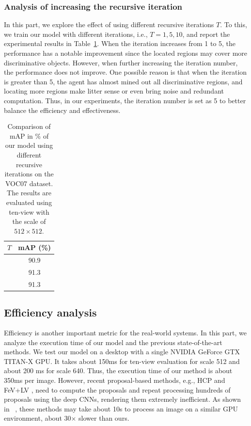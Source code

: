 \documentclass[letterpaper]{article} %
\begin{document}
\subsubsection{Analysis of increasing the recursive iteration}
In this part, we explore the effect of using different recursive iterations $T$. To this, we train our model with different iterations, i.e., $T=1,5,10$, and report the experimental results in Table~\ref{table:recursive_step}. When the iteration increases from 1 to 5, the performance has a notable improvement since the located regions may cover more discriminative objects. However, when further increasing the iteration number, the performance does not improve. One possible reason is that when the iteration is greater than 5, the agent has almost mined out all discriminative regions, and locating more regions make litter sense or even bring noise and redundant computation. Thus, in our experiments, the iteration number is set as 5 to better balance the efficiency and effectiveness.

\begin{table}[htp]
\centering
\begin{tabular}{c|c}
\hline
\centering $T$  & mAP (\%) \\
\hline
\hline
\centering 1 & 90.9  \\
\centering 5  & 91.3  \\
\centering 10 & 91.3 \\
\hline
\end{tabular}
\caption{Comparison of mAP in \% of our model using different recursive iterations on the VOC07 dataset. The results are evaluated using ten-view with the scale of $512\times 512$.}
\label{table:recursive_step}
\end{table}



\subsection{Efficiency analysis}
Efficiency is another important metric for the real-world systems. In this part, we analyze the execution time of our model and the previous state-of-the-art methods. We test our model on a desktop with a single NVIDIA GeForce GTX TITAN-X GPU. It takes about 150ms for ten-view evaluation for scale 512 and about 200 ms for scale 640. Thus, the execution time of our method is about 350ms per image. However, recent proposal-based methods, e.g., HCP \cite{wei2016hcp} and FeV+LV \cite{yang2016exploit}, need to compute the proposals and repeat processing hundreds of proposals using the deep CNNs, rendering them extremely inefficient. As shown in ~\cite{wei2016hcp}, these methods may take about 10s to process an image on a similar GPU environment, about 30$\times$ slower than ours.
\end{document}
